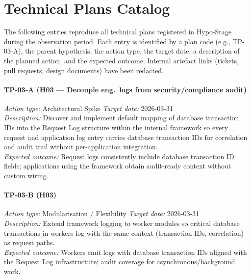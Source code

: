 \bigskip
\section{Technical Plans Catalog}
\label{sec:app-technical-plans}

The following entries reproduce all technical plans registered in Hypo-Stage
during the observation period. Each entry is identified by a plan code
(e.g., TP-03-A), the parent hypothesis, the action type, the target date, a
description of the planned action, and the expected outcome. Internal artefact
links (tickets, pull requests, design documents) have been redacted.

\vspace{6pt}

\paragraph{TP-03-A \textnormal{(H03 — Decouple eng.\ logs from security/compliance audit)}}
\textit{Action type:} Architectural Spike \quad \textit{Target date:} 2026-03-31 \\
\textit{Description:} Discover and implement default mapping of database
transaction IDs into the Request Log structure within the internal framework
so every request and application log entry carries database transaction IDs for
correlation and audit trail without per-application integration. \\
\textit{Expected outcome:} Request logs consistently include database transaction
ID fields; applications using the framework obtain audit-ready context without
custom wiring.

\paragraph{TP-03-B \textnormal{(H03)}}
\textit{Action type:} Modularisation / Flexibility \quad \textit{Target date:} 2026-03-31 \\
\textit{Description:} Extend framework logging to worker modules so critical
database transactions in workers log with the same context (transaction IDs,
correlation) as request paths. \\
\textit{Expected outcome:} Workers emit logs with database transaction IDs
aligned with the Request Log infrastructure; audit coverage for
asynchronous/background work.

